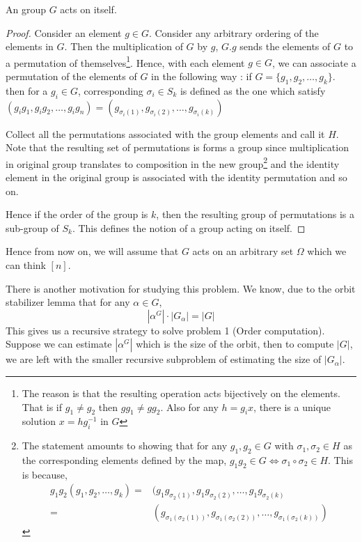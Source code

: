 \begin{claim}
	An group $G$ acts on itself. 
\end{claim}
\begin{proof}
Consider an element $g \in G$. Consider any arbitrary ordering of the elements
in $G$. Then the multiplication of $G$ by $g$, $G.g$ sends
the elements of $G$ to a permutation of themselves\footnote{The reason is that
	the resulting
operation acts bijectively on the elements. That is if $g_1 \ne g_2$ then
$gg_1 \ne gg_2$. Also for any $h = g_ix$, there is a unique solution $x =
hg_i^{-1}$ in $G$}. Hence, with each element
$g \in G$, we can associate a permutation of the elements of $G$ in the
following way : if $G = \{g_1,g_2,\ldots,g_k\}$. then for a $g_i \in G$,
corresponding $\sigma_i \in S_k$ is defined as the one which satisfy
$(g_ig_1,g_ig_2,\ldots,g_ig_n) = (g_{\sigma_i(1)}, g_{\sigma_i(2)}, \ldots, 
g_{\sigma_i(k)})$

Collect all the permutations associated with the group elements and call it
$H$. Note that the resulting set of permutations is forms a group since
multiplication in original group translates to composition in the new
group\footnote{ The statement amounts to showing that for 
	any $g_1,g_2 \in G$ with $\sigma_1, \sigma_2 \in H$ as
	the corresponding elements defined by the map, 
	$g_1g_2 \in G \iff \sigma_1 \circ \sigma_2 \in H$. This is because, 
	\begin{align*}
		g_1g_2 (g_1, g_2, \ldots, g_k) 
		= & (g_1 g_{\sigma_2(1)}, g_1 g_{\sigma_2(2)}, \ldots, 
		g_1 g_{\sigma_2(k)} \\
		= & (g_{\sigma_1(\sigma_2(1))}, g_{\sigma_1(\sigma_2(2))},
		\ldots, g_{\sigma_1(\sigma_2(k))})
	\end{align*}
}
and the identity element in the original group is associated with the identity
permutation and so on.

Hence if the order of the group is $k$, then the resulting group of
permutations is a sub-group of $S_{k}$. This defines the notion of a group
acting on itself.
\end{proof}
\begin{note}
Hence from now on, we will assume that $G$ acts on an arbitrary set $\Omega$
which we can think $[n]$.
\end{note}

There is another motivation for studying this problem. We know, due to the 
orbit stabilizer lemma that for any $\alpha \in  G$, $$|\alpha^{G}|\cdot
|G_{\alpha}| = |G|$$ This gives us a recursive strategy to solve problem 1
(Order computation). Suppose we can estimate $|\alpha^{G}|$ which is the size
of the orbit, then to compute $|G|$, we are left with the smaller recursive
subproblem of estimating the size of $|G_{\alpha}|$. 

